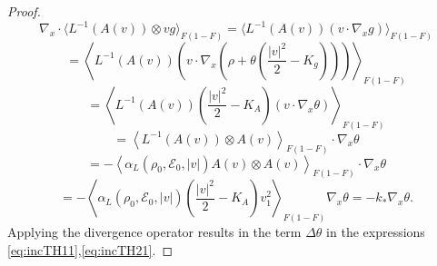 \begin{proof}
 
\[\nabla_x \cdot\langle  L^{-1}(A(v))\otimes vg \rangle_{F(1-F)}= \langle 
L^{-1}(A(v))  (v\cdot \nabla_x g )\rangle_{F(1-F)}\]
\[=\left\langle   L^{-1}(A(v)) \left(v\cdot \nabla_x
\left(\rho+\theta\left(\frac{|v|^2}{2}-K_g\right)\right)\right) 
\right\rangle_{F(1-F)}\]
\[= \left\langle   L^{-1}(A(v)) \left( \frac{|v|^2}{2}-K_A\right)  \left(v\cdot
\nabla_x \theta \right)\right\rangle_{F(1-F)}
\]
\[=\left\langle    L^{-1}(A(v)) \otimes A(v)\right\rangle_{F(1-F)}\cdot \nabla_x
\theta\]
\[=-\left\langle \alpha_L(\rho_0,\mathcal E_0,|v|) A(v) \otimes     A(v)  
\right\rangle_{F(1-F)}\cdot \nabla_x \theta\]
\[=-\left\langle \alpha_L(\rho_0,\mathcal E_0,|v|) \left( \frac{|v|^2}{2}-K_A\right)v_1^2  
\right\rangle_{F(1-F)}\nabla_x \theta = -k_\ast\nabla_x \theta.\]
Applying the divergence operator results in the term $\Delta\theta$ in 
the expressions \eqref{eq:incTH11},\eqref{eq:incTH21}.


\end{proof}
